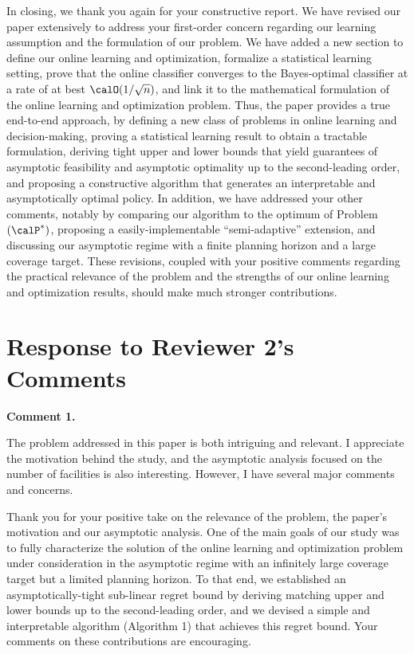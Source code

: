 \documentclass[11pt]{article}
\begin{document}
In closing, we thank you again for your constructive report. We have revised our paper extensively to address your first-order concern regarding our learning assumption and the formulation of our problem. We have added a new section to define our online learning and optimization, formalize a statistical learning setting, prove that the online classifier converges to the Bayes-optimal classifier at a rate of at best $\calO(1/\sqrt{n})$, and link it to the mathematical formulation of the online learning and optimization problem. Thus, the paper provides a true end-to-end approach, by defining a new class of problems in online learning and decision-making, proving a statistical learning result to obtain a tractable formulation, deriving tight upper and lower bounds that yield guarantees of asymptotic feasibility and asymptotic optimality up to the second-leading order, and proposing a constructive algorithm that generates an interpretable and asymptotically optimal policy. In addition, we have addressed your other comments, notably by comparing our algorithm to the optimum of Problem $(\calP^*)$, proposing a easily-implementable ``semi-adaptive'' extension, and discussing our asymptotic regime with a finite planning horizon and a large coverage target. These revisions, coupled with your positive comments regarding the practical relevance of the problem and the strengths of our online learning and optimization results, should make much stronger contributions.

\newpage
\section*{Response to Reviewer 2’s Comments}
%

\begin{commentBox}
    \textbf{Comment 1.}\label{R2:1}

    The problem addressed in this paper is both intriguing and relevant. I appreciate the motivation behind the study, and the asymptotic analysis focused on the number of facilities is also interesting. However, I have several major comments and concerns.
\end{commentBox}

Thank you for your positive take on the relevance of the problem, the paper's motivation and our asymptotic analysis. One of the main goals of our study was to fully characterize the solution of the online learning and optimization problem under consideration in the asymptotic regime with an infinitely large coverage target but a limited planning horizon. To that end, we established an asymptotically-tight sub-linear regret bound by deriving matching upper and lower bounds up to the second-leading order, and we devised a simple and interpretable algorithm (Algorithm 1) that achieves this regret bound. Your comments on these contributions are encouraging.
\end{document}
